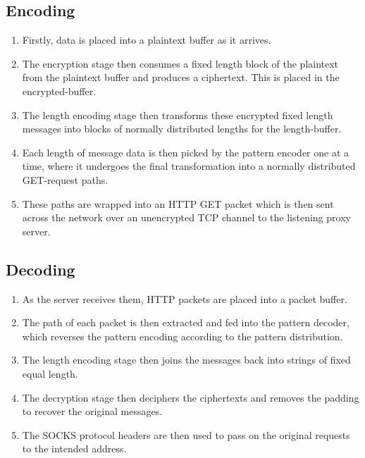 \documentclass[ %
                    author={Samuel Russell},
                supervisor={Prof. Bogdan Warinschi},
                    degree={MEng},
                     title={Innocuous Ciphertexts},
                  subtitle={The DE-CENSOR Scheme},
                      type={Research},
                      year={2018} ]{dissertation}
\begin{document}
\subsection{Encoding}

\begin{enumerate}
\item Firstly, data is placed into a plaintext buffer as it arrives.

\item The encryption stage then consumes a fixed length block of the plaintext from the plaintext buffer and produces a ciphertext.
This is placed in the encrypted-buffer.

\item The length encoding stage then transforms these encrypted fixed length messages into blocks of normally distributed lengths for the length-buffer.

\item Each length of message data is then picked by the pattern encoder one at a time, where it undergoes the final transformation into a normally distributed GET-request paths.

\item These paths are wrapped into an HTTP GET packet which is then sent across the network over an unencrypted TCP channel to the listening proxy server.
\end{enumerate}

\subsection{Decoding}

\begin{enumerate}
\item As the server receives them, HTTP packets are placed into a packet buffer.

\item The path of each packet is then extracted and fed into the pattern decoder, which reverses the pattern encoding according to the pattern distribution.

\item The length encoding stage then joins the messages back into strings of fixed equal length.

\item The decryption stage then deciphers the ciphertexts and removes the padding to recover the original messages.

\item The SOCKS protocol headers are then used to pass on the original requests to the intended address.

\end{enumerate}
\end{document}

